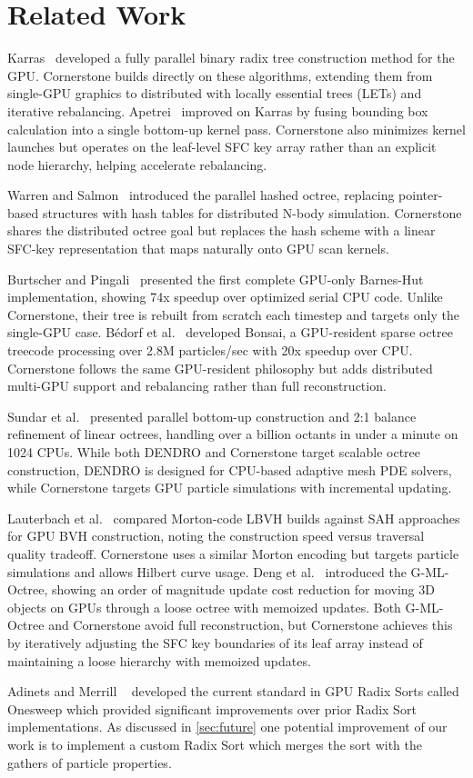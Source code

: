 \section{Related Work}
\label{sec:related_work}

Karras~\cite{karras} developed a fully parallel binary radix tree construction method for the GPU. Cornerstone builds directly on these algorithms, extending them from single-GPU graphics to distributed with locally essential trees (LETs) and iterative rebalancing. Apetrei~\cite{lbvh} improved on Karras by fusing bounding box calculation into a single bottom-up kernel pass. Cornerstone also minimizes kernel launches but operates on the leaf-level SFC key array rather than an explicit node hierarchy, helping accelerate rebalancing.

Warren and Salmon~\cite{warren1993} introduced the parallel hashed octree, replacing pointer-based structures with hash tables for distributed N-body simulation. Cornerstone shares the distributed octree goal but replaces the hash scheme with a linear SFC-key representation that maps naturally onto GPU scan kernels.

Burtscher and Pingali~\cite{burtscher2011} presented the first complete GPU-only Barnes-Hut implementation, showing 74x speedup over optimized serial CPU code. Unlike Cornerstone, their tree is rebuilt from scratch each timestep and targets only the single-GPU case. B\'{e}dorf et al.~\cite{bedorf2012} developed Bonsai, a GPU-resident sparse octree treecode processing over 2.8M particles/sec with 20x speedup over CPU. Cornerstone follows the same GPU-resident philosophy but adds distributed multi-GPU support and rebalancing rather than full reconstruction.

Sundar et al.~\cite{sundar2008} presented parallel bottom-up construction and 2:1 balance refinement of linear octrees, handling over a billion octants in under a minute on 1024 CPUs. While both DENDRO and Cornerstone target scalable octree construction, DENDRO is designed for CPU-based adaptive mesh PDE solvers, while Cornerstone targets GPU particle simulations with incremental updating.

Lauterbach et al.~\cite{lauterbach2009} compared Morton-code LBVH builds against SAH approaches for GPU BVH construction, noting the construction speed versus traversal quality tradeoff. Cornerstone uses a similar Morton encoding but targets particle simulations and allows Hilbert curve usage. Deng et al.~\cite{mloctree2018} introduced the G-ML-Octree, showing an order of magnitude update cost reduction for moving 3D objects on GPUs through a loose octree with memoized updates. Both G-ML-Octree and Cornerstone avoid full reconstruction, but Cornerstone achieves this by iteratively adjusting the SFC key boundaries of its leaf array instead of maintaining a loose hierarchy with memoized updates.

Adinets and Merrill ~\cite{adinets2022onesweepfastersignificantdigit} developed the current standard in GPU Radix Sorts called Onesweep which provided significant improvements over prior Radix Sort implementations. As discussed in \ref{sec:future} one potential improvement of our work is to implement a custom Radix Sort which merges the sort with the gathers of particle properties.
